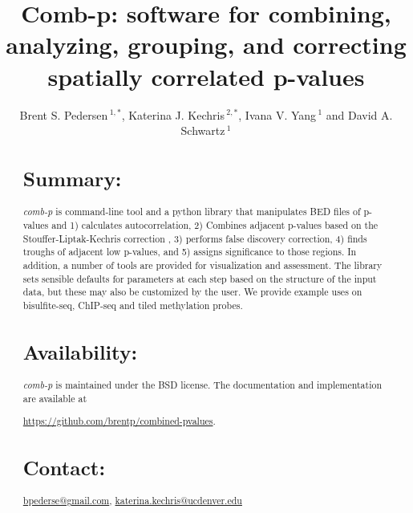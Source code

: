 \documentclass{bioinfo}
\begin{document}

\title[comb-p]{Comb-p: software for combining, analyzing, grouping, and correcting spatially correlated p-values}
\author[Pedersen \textit{et~al}]{Brent S. Pedersen\,$^{1,*}$,
Katerina J.  Kechris\,$^{2,*}$,
    Ivana V. Yang\,$^{1}$ and David A. Schwartz\,$^1$}
\address{$^{1}$Department of Medicine, University of Colorado, Denver, Anschutz Medical Campus, Aurora CO 80045, USA\\
$^{2}$Department of Statistics, University of Colorado, Denver, Anschutz Medical Campus, Aurora CO 80045, USA\\
}
\maketitle
\begin{abstract}

\section{Summary:}
\textit{comb-p} is command-line tool and a python library that
manipulates BED files of p-values and 1) calculates autocorrelation, 2) Combines
adjacent p-values based on the Stouffer-Liptak-Kechris correction \citep{Kechris2010},
3) performs false discovery correction, 4) finds troughs of adjacent low p-values,
and 5) assigns significance to those regions.
In addition, a number of tools are provided for visualization and
assessment. The library sets sensible defaults for parameters at each
step based on the structure of the input data, but these may also be customized
by the user. We provide example uses on bisulfite-seq, ChIP-seq and tiled methylation
probes.

\section{Availability:}
\textit{comb-p} is maintained under the BSD license. The documentation and
implementation are available at

\href{https://github.com/brentp/combined-pvalues}{https://github.com/brentp/combined-pvalues}.
\section{Contact:} \href{bpederse@gmail.com}{bpederse@gmail.com},
\href{katerina.kechris@ucdenver.edu}{katerina.kechris@ucdenver.edu}

\end{abstract}
\end{document}
